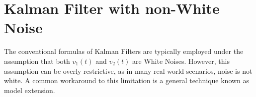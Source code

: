 \section{Kalman Filter with non-White Noise}

The conventional formulas of Kalman Filters are typically employed under the assumption that both $v_1(t)$ and $v_2(t)$ are White Noises. 
However, this assumption can be overly restrictive, as in many real-world scenarios, noise is not white.
A common workaround to this limitation is a general technique known as model extension.